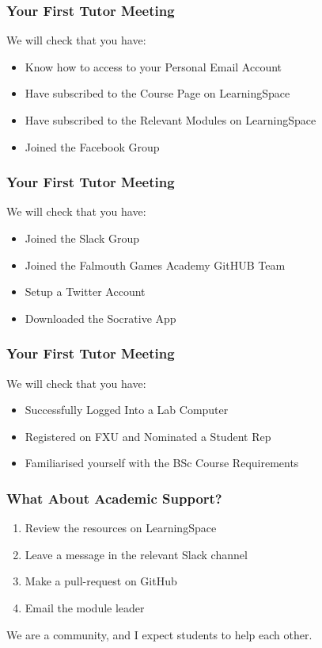 \begin{frame}
	\frametitle{Your First Tutor Meeting}	
	
	We will check that you have:
	
	\begin{itemize}
	\item Know how to access to your Personal Email Account
	\item Have subscribed to the Course Page on LearningSpace
	\item Have subscribed to the Relevant Modules on LearningSpace
	\item Joined the Facebook Group
	\end{itemize}
\end{frame}

\begin{frame}
	\frametitle{Your First Tutor Meeting}	
	
	We will check that you have:
	
	\begin{itemize}
	\item Joined the Slack Group
	\item Joined the Falmouth Games Academy GitHUB Team
	\item Setup a Twitter Account
	\item Downloaded the Socrative App
	\end{itemize}
\end{frame}

\begin{frame}
	\frametitle{Your First Tutor Meeting}	
	
	We will check that you have:
	
	\begin{itemize}
	\item Successfully Logged Into a Lab Computer
	\item Registered on FXU and Nominated a Student Rep
	\item Familiarised yourself with the BSc Course Requirements
	\end{itemize}
\end{frame}

\begin{frame}
	\frametitle{What About Academic Support?}	
	\begin{enumerate}
		\item Review the resources on LearningSpace
		\item Leave a message in the relevant Slack channel
		\item Make a pull-request on GitHub
		\item Email the module leader
	\end{enumerate}
	
	We are a community, and I expect students to help each other.
\end{frame}

